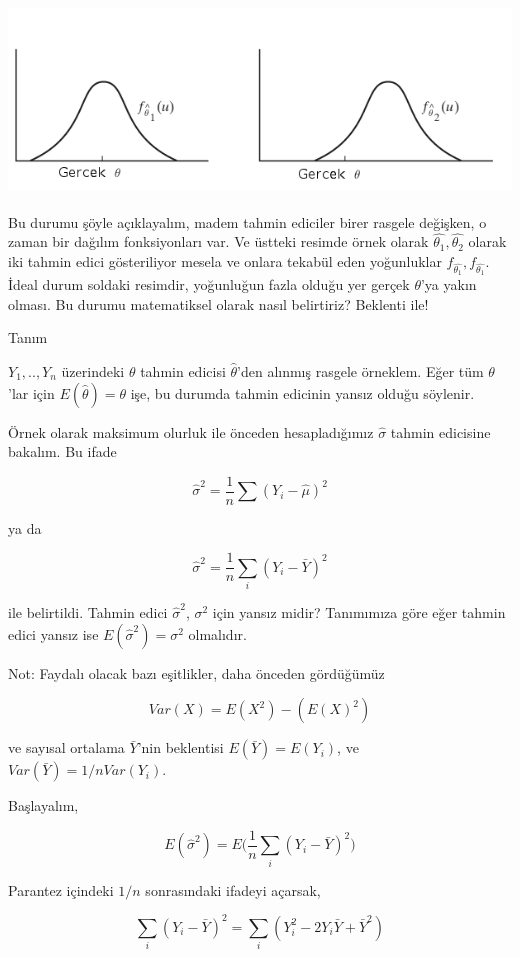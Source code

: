 \documentclass[12pt,fleqn]{article}\usepackage{../../common}
\begin{document}
\includegraphics[height=5cm]{unbias.png}

Bu durumu şöyle açıklayalım, madem tahmin ediciler birer rasgele değişken,
o zaman bir dağılım fonksiyonları var. Ve üstteki resimde örnek olarak
$\hat{\theta_1},\hat{\theta_2}$ olarak iki tahmin edici gösteriliyor mesela
ve onlara tekabül eden yoğunluklar $f_{\hat{\theta_1}},
f_{\hat{\theta_1}}$. İdeal durum soldaki resimdir, yoğunluğun fazla olduğu
yer gerçek $\theta$'ya yakın olması. Bu durumu matematiksel olarak nasıl
belirtiriz? Beklenti ile!

Tanım

$Y_1,..,Y_n$ üzerindeki $\theta$ tahmin edicisi $\hat{\theta} $'den alınmış
rasgele örneklem. Eğer tüm $\theta$'lar için $E(\hat{\theta}) = \theta$
işe, bu durumda tahmin edicinin yansız olduğu söylenir.

Örnek olarak maksimum olurluk ile önceden hesapladığımız $\hat{\sigma}$
tahmin edicisine bakalım. Bu ifade

$$ \hat{\sigma}^2 = \frac{1}{n}\sum (Y_i-\hat{\mu})^2 $$

ya da 

$$ \hat{\sigma}^2 = \frac{1}{n}\sum_i (Y_i-\bar{Y})^2 $$

ile belirtildi. Tahmin edici $\hat{\sigma}^2$, $\sigma^2$ için yansız midir?
Tanımımıza göre eğer tahmin edici yansız ise $E(\hat{\sigma}^2) = \sigma^2$
olmalıdır.

Not: Faydalı olacak bazı eşitlikler, daha önceden gördüğümüz

$$ Var(X) = E(X^2) - (E(X)^2)$$

ve sayısal ortalama $\bar{Y}$'nin beklentisi $E({\bar{Y}}) = E(Y_i)$, ve
$Var(\bar{Y}) = 1/n Var(Y_i)$.

Başlayalım,

$$ E(\hat{\sigma}^2) = E\bigg(\frac{1}{n}\sum_i (Y_i-\bar{Y})^2 \bigg)$$

Parantez içindeki $1/n$ sonrasındaki ifadeyi açarsak,


$$ \sum_i (Y_i-\bar{Y})^2  =  \sum_i (Y_i^2-2Y_i\bar{Y}+ \bar{Y}^2)$$
\end{document}
